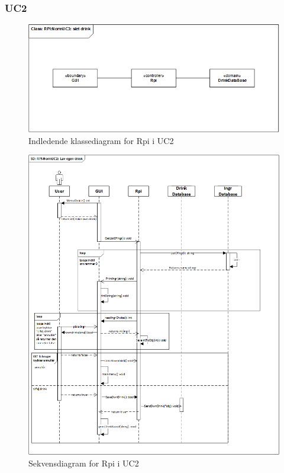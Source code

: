 \subsubsection{UC2}

\begin{figure}[H]
    \centering
    \includegraphics[width=1\textwidth]{Images/Applikationsmodeller/rpi/rpi_klassediagramNormUC3.png}
    \caption{Indledende klassediagram for Rpi i UC2}
    \label{fig:cdUC2Rpi}
\end{figure}

\begin{figure}[H]
    \centering
    \includegraphics[width=1\textwidth]{Images/Applikationsmodeller/rpi/rpi_sekvensdiagramNormUC2.png}
    \caption{Sekvensdiagram for Rpi i UC2}
    \label{fig:sdUC2Rpi}
\end{figure}


